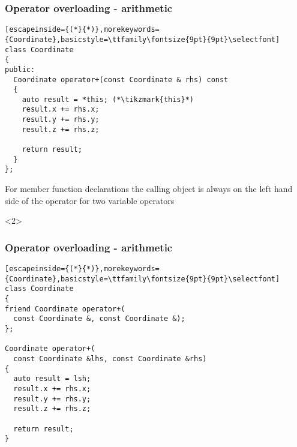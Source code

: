 \documentclass[14pt,a4paper,dvipsnames,usenames]{beamer}
\begin{document}
\begin{frame}[fragile]
  \frametitle{Operator overloading - arithmetic}

  \begin{lstlisting}[escapeinside={(*}{*)},morekeywords={Coordinate},basicstyle=\ttfamily\fontsize{9pt}{9pt}\selectfont]
class Coordinate
{
public:
  Coordinate operator+(const Coordinate & rhs) const
  {
    auto result = *this; (*\tikzmark{this}*)
    result.x += rhs.x;
    result.y += rhs.y;
    result.z += rhs.z;
    
    return result;
  }
};
  \end{lstlisting}

  \vspace{.2em}
  {
    For member function declarations the calling object is always on the left hand
    side of the operator for two variable operators
  }

  \begin{onlyenv}<2>
    \nointerlineskip
  \end{onlyenv}
  
\end{frame}

\begin{frame}[fragile]
  \frametitle{Operator overloading - arithmetic}

  \begin{lstlisting}[escapeinside={(*}{*)},morekeywords={Coordinate},basicstyle=\ttfamily\fontsize{9pt}{9pt}\selectfont]
class Coordinate
{
friend Coordinate operator+(
  const Coordinate &, const Coordinate &);
};

Coordinate operator+(
  const Coordinate &lhs, const Coordinate &rhs)
{
  auto result = lsh;
  result.x += rhs.x;
  result.y += rhs.y;
  result.z += rhs.z;
  
  return result;
}
  \end{lstlisting}
  
\end{frame}
\end{document}
